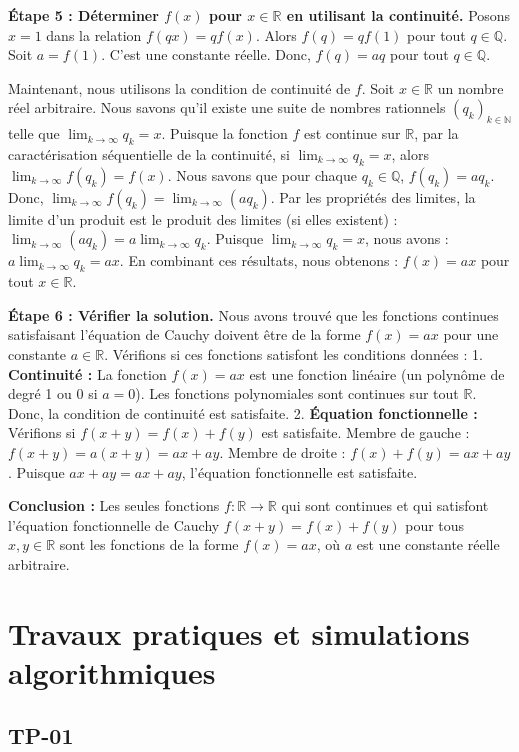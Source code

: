\documentclass[12pt,a4paper]{report}
\begin{document}
\textbf{Étape 5 : Déterminer $f(x)$ pour $x \in \mathbb{R}$ en utilisant la continuité.}
Posons $x=1$ dans la relation $f(qx) = qf(x)$.
Alors $f(q) = qf(1)$ pour tout $q \in \mathbb{Q}$.
Soit $a = f(1)$. C'est une constante réelle.
Donc, $f(q) = aq$ pour tout $q \in \mathbb{Q}$.

Maintenant, nous utilisons la condition de continuité de $f$.
Soit $x \in \mathbb{R}$ un nombre réel arbitraire.
Nous savons qu'il existe une suite de nombres rationnels $(q_k)_{k \in \mathbb{N}}$ telle que $\lim_{k \to \infty} q_k = x$.
Puisque la fonction $f$ est continue sur $\mathbb{R}$, par la caractérisation séquentielle de la continuité, si $\lim_{k \to \infty} q_k = x$, alors $\lim_{k \to \infty} f(q_k) = f(x)$.
Nous savons que pour chaque $q_k \in \mathbb{Q}$, $f(q_k) = aq_k$.
Donc, $\lim_{k \to \infty} f(q_k) = \lim_{k \to \infty} (aq_k)$.
Par les propriétés des limites, la limite d'un produit est le produit des limites (si elles existent) :
$\lim_{k \to \infty} (aq_k) = a \lim_{k \to \infty} q_k$.
Puisque $\lim_{k \to \infty} q_k = x$, nous avons :
$a \lim_{k \to \infty} q_k = ax$.
En combinant ces résultats, nous obtenons :
$f(x) = ax$ pour tout $x \in \mathbb{R}$.

\textbf{Étape 6 : Vérifier la solution.}
Nous avons trouvé que les fonctions continues satisfaisant l'équation de Cauchy doivent être de la forme $f(x) = ax$ pour une constante $a \in \mathbb{R}$.
Vérifions si ces fonctions satisfont les conditions données :
1.  \textbf{Continuité :} La fonction $f(x) = ax$ est une fonction linéaire (un polynôme de degré 1 ou 0 si $a=0$). Les fonctions polynomiales sont continues sur tout $\mathbb{R}$. Donc, la condition de continuité est satisfaite.
2.  \textbf{Équation fonctionnelle :} Vérifions si $f(x+y) = f(x) + f(y)$ est satisfaite.
    Membre de gauche : $f(x+y) = a(x+y) = ax + ay$.
    Membre de droite : $f(x) + f(y) = ax + ay$.
    Puisque $ax+ay = ax+ay$, l'équation fonctionnelle est satisfaite.

\textbf{Conclusion :}
Les seules fonctions $f: \mathbb{R} \to \mathbb{R}$ qui sont continues et qui satisfont l'équation fonctionnelle de Cauchy $f(x+y) = f(x) + f(y)$ pour tous $x, y \in \mathbb{R}$ sont les fonctions de la forme $f(x) = ax$, où $a$ est une constante réelle arbitraire.


\chapter{Travaux pratiques et simulations algorithmiques}
\section{TP-01}
\end{document}
